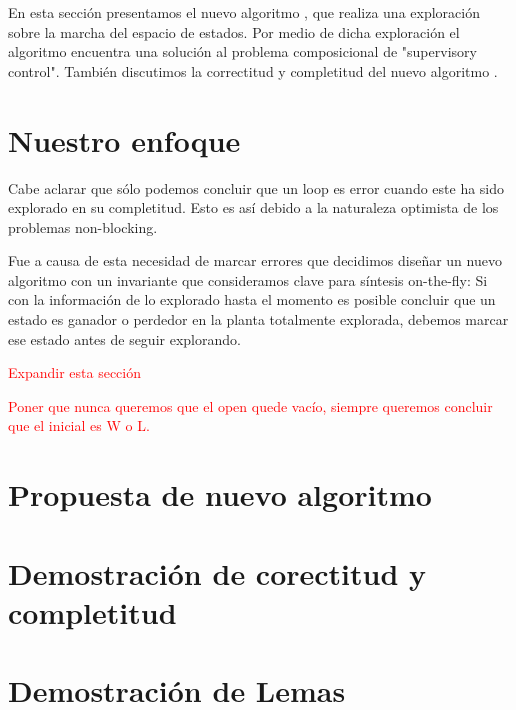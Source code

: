 En esta sección presentamos el nuevo algoritmo \DCS, que realiza una exploración sobre la marcha del espacio de estados. Por medio de dicha exploración el algoritmo encuentra una solución al problema composicional de "supervisory control". También discutimos la correctitud y completitud del nuevo algoritmo \DCS. \\

\section{Nuestro enfoque}

Cabe aclarar que sólo podemos concluir que un loop es error cuando este ha sido explorado en su completitud. Esto es así debido a la naturaleza optimista de los problemas non-blocking.

Fue a causa de esta necesidad de marcar errores que decidimos diseñar un nuevo algoritmo con un invariante que consideramos clave para síntesis on-the-fly: Si con la información de lo explorado hasta el momento es posible concluir que un estado es ganador o perdedor en la planta totalmente explorada, debemos marcar ese estado antes de seguir explorando.

\textcolor{red}{Expandir esta sección}

\textcolor{red}{Poner que nunca queremos que el open quede vacío, siempre queremos concluir que el inicial es W o L.}

\section{Propuesta de nuevo algoritmo}



\FloatBarrier

\section{Demostración de corectitud y completitud}


\section{Demostración de Lemas}

